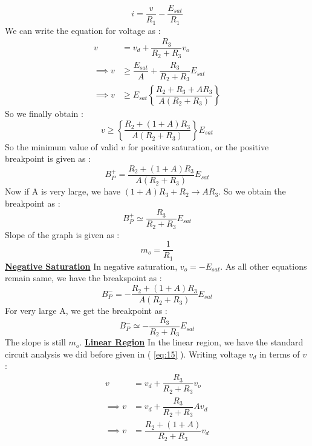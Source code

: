 \documentclass[12pt]{article}
\newcommand*{\myref}[1]{%
  \begingroup
    \hypersetup{
      linkcolor=linkequation,
      linkbordercolor=linkequation,
    }%
    \ref{#1}%
  \endgroup
}
\begin{document}
\begin{equation}
	i=\dfrac{v}{R_1}-\dfrac{E_{sat}}{R_1} \label{eq:17}
\end{equation}
We can write the equation for voltage as :
\begin{align*}
	v&= v_d+\dfrac{R_3}{R_2+R_3}v_o \\
	\implies v & \geq \dfrac{E_{sat}}{A}+\dfrac{R_3}{R_2+R_3}E_{sat} \\
	\implies v & \geq E_{sat}\left\{ \dfrac{R_2+R_3+AR_3}{A(R_2+R_3)} \right\}
\end{align*}
So we finally obtain :
\begin{equation}
	v \geq \left\{ \dfrac{R_2+(1+A)R_3}{A(R_2+R_3)} \right\} E_{sat} \label{eq:18}
\end{equation}
So the minimum value of valid $v$ for positive saturation, or the positive breakpoint is given as :
\begin{equation}
	B^+_P = \dfrac{R_2+(1+A)R_3}{A(R_2+R_3)} E_{sat} \label{eq:19}
\end{equation}
Now if A is very large, we have $(1+A)R_3+R_2 \longrightarrow AR_3$. So we obtain the breakpoint as :
\begin{equation}
	B^+_P \simeq \dfrac{R_3}{R_2+R_3}E_{sat} \label{eq:20}
\end{equation}
Slope of the graph is given as :
\begin{equation}
	m_o=\dfrac{1}{R_1} \label{eq:21}
\end{equation}
\textbf{\uline{Negative Saturation}} \linebreak %
In negative saturation, $v_o=-E_{sat}$. As all other equations remain same, we have the breakspoint as :
\begin{equation}
	B^-_P = - \dfrac{R_2+(1+A)R_3}{A(R_2+R_3)}E_{sat} \label{eq:22}
\end{equation}
For very large A, we get the breakpoint as :
\begin{equation}
	B^-_P \simeq -\dfrac{R_3}{R_2+R_3}E_{sat} \label{eq:23}
\end{equation}
The slope is still $m_o$. \linebreak
\textbf{\uline{Linear Region}} \linebreak %
In the linear region, we have the standard circuit analysis we did before given in (\myref{eq:15}). \linebreak
Writing voltage $v_d$ in terms of $v$ :
\begin{align*}
	v&=v_d+\dfrac{R_3}{R_2+R_3}v_o \\
	\implies v &= v_d+\dfrac{R_3}{R_2+R_3}Av_d \\
	\implies v&= \dfrac{R_2+(1+A)}{R_2+R_3} v_d 
\end{align*}
\end{document}
